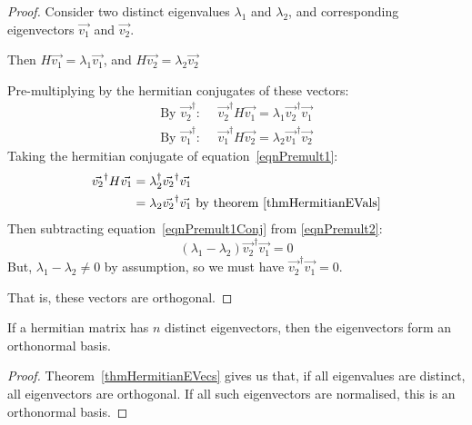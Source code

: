 \documentclass[../Main.tex]{subfiles}
\begin{document}
\begin{proof}
    Consider two distinct eigenvalues $\lambda_1$ and $\lambda_2$, and corresponding eigenvectors $\vec{v_1}$ and $\vec{v_2}$.\par
    Then $H \vec{v_1} = \lambda_1 \vec{v_1}$, and $H \vec{v_2} = \lambda_2 \vec{v_2}$\par
    Pre-multiplying by the hermitian conjugates of these vectors:
    \begin{align}
        \text{By } \vec{v_2}^\dagger:&~~\vec{v_2}^\dagger H \vec{v_1} = \lambda_1 \vec{v_2}^\dagger \vec{v_1} \label{eqnPremult2} \\
        \text{By } \vec{v_1}^\dagger:&~~\vec{v_1}^\dagger H \vec{v_2} = \lambda_2 \vec{v_1}^\dagger \vec{v_2} \label{eqnPremult1}
    \end{align}
    Taking the hermitian conjugate of equation~\ref{eqnPremult1}:
    \begin{align}
        \vec{v_2}^\dagger H \vec{v_1} &= \lambda_2^\dagger \vec{v_2}^\dagger \vec{v_1} \nonumber \\
        &= \lambda_2 \vec{v_2}^\dagger \vec{v_1} \text{ by theorem~\ref{thmHermitianEVals}} \label{eqnPremult1Conj} 
    \end{align}
    Then subtracting equation~\ref{eqnPremult1Conj} from \ref{eqnPremult2}:
    \begin{equation*}
        (\lambda_1 - \lambda_2)\vec{v_2}^\dagger \vec{v_1} = 0
    \end{equation*}
    But, $\lambda_1 - \lambda_2 \neq 0$ by assumption, so we must have $\vec{v_2}^\dagger \vec{v_1} = 0$.\par
    That is, these vectors are orthogonal.
\end{proof}
\begin{corollary}
    If a hermitian matrix has $n$ distinct eigenvectors, then the eigenvectors form an orthonormal basis.
    \label{corHermitianEVecBasis}
\end{corollary}
\begin{proof}
    Theorem~\ref{thmHermitianEVecs} gives us that, if all eigenvalues are distinct, all eigenvectors are orthogonal. If all such eigenvectors are normalised, this is an orthonormal basis.
\end{proof}
\end{document}
